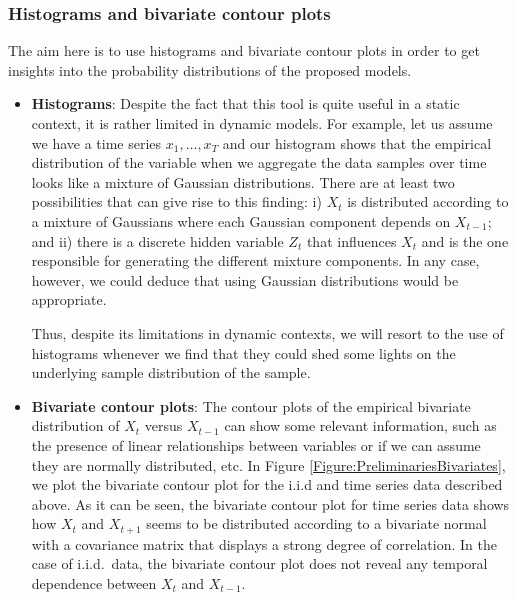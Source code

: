 \subsubsection{Histograms and bivariate contour plots}

The aim here is to use histograms and bivariate contour plots in order to get insights into the probability distributions of the proposed models. 

\begin{itemize}
\item \textbf{Histograms}: Despite the fact that this tool is quite useful in a static context, it is rather limited in dynamic models. For example, let us assume we have a time series $x_1,\ldots, x_T$ and our histogram shows that the empirical distribution of the variable when we aggregate the data samples over time looks like a mixture of Gaussian distributions. There are at least two possibilities that can give rise to this finding: 
i) $X_t$ is distributed according to a mixture of Gaussians where each Gaussian component depends on $X_{t-1}$; and ii) there is a discrete hidden variable $Z_t$ that influences $X_{t}$ and is the one responsible for generating the different mixture components. In any case, however, we could deduce that using Gaussian distributions would be appropriate.

Thus, despite its limitations in dynamic contexts, we will resort to the use of histograms whenever we find that they could shed some lights on the underlying sample distribution of the sample.

\item \textbf{Bivariate contour plots}: The contour plots of the empirical bivariate distribution of $X_t$ versus $X_{t-1}$ can show some relevant information, such as the presence of linear relationships between variables or if we can assume they are normally distributed, etc. In Figure \ref{Figure:PreliminariesBivariates}, we plot the bivariate contour plot for the i.i.d and time series data described above. As it can be seen, the bivariate contour plot for time series data shows how $X_t$ and $X_{t+1}$ seems to be distributed according to a bivariate normal with a covariance matrix that displays a strong degree of correlation. In the case of i.i.d.\ data, the bivariate contour plot does not reveal any temporal dependence between $X_t$ and $X_{t-1}$. 


\end{itemize}
